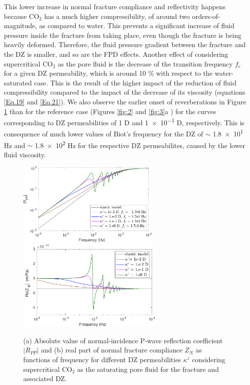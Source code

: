 \documentclass[draft]{agujournal2019}
\begin{document}
This lower increase in normal fracture compliance and reflectivity happens because CO$_2$ has a much higher compressibility, of around two orders-of-magnitude, as compared to water.  This prevents a significant increase of fluid pressure inside the fracture from taking place, even though the fracture is being heavily deformed. Therefore, the fluid pressure gradient between the fracture and the DZ is smaller, and so are the FPD effects.
Another effect of considering supercritical CO$_2$ as the pore fluid is the decrease of the transition frequency $f_c$ for a given DZ permeability, which is around 10 \% with respect to the water-saturated case. This is the result of the higher impact of the reduction of  fluid compressibility compared to the impact of the decrease of its viscosity (equations \eqref{Eq.19} and \eqref{Eq.21}). We also observe the earlier onset of reverberations in Figure \ref{fig:9} than for the reference case (Figures \ref{fig:2} and \ref{fig:3}a ) for the curves corresponding to DZ permeabilities of 1 D and \num{1 e-1} D, respectively. This is consequence of much lower values of Biot's frequency for the DZ of $\sim$ \num{1.8e1} Hz and $\sim$ \num{1.8e2} Hz for the respective DZ permeabilites, caused by the lower fluid viscosity.

\begin{figure}[hp]
\centering
    \subcaptionbox{}
      {
       \includegraphics[width=70mm, height=43 mm]{figures/elasporo_1mm_co2fdz_ksen_h20e-2.pdf}
        }
    \subcaptionbox{}
      {
        \includegraphics[width=73mm, height=45mm]{figures/elasporo_1mm_co2fdz_znsen_h20e-2.pdf}
        }
\caption {(a) Absolute value of normal-incidence P-wave reflection coefficient $|R_{PP}|$ and (b) real part of normal fracture compliance $Z_N$ as functions of frequency for different DZ permeabilities $\kappa^z$ considering supercritical CO$_2$ as the saturating pore fluid for the fracture and associated DZ.}
\label{fig:9}
\end{figure}
\end{document}
